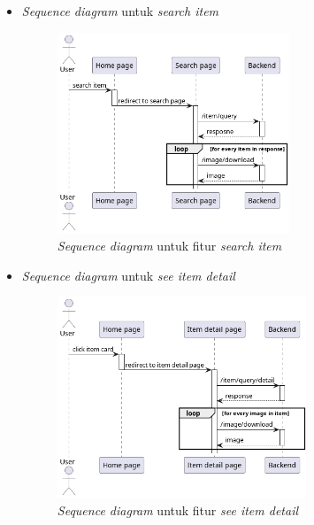 \documentclass[a4paper]{article}
\begin{document}
\begin{enumerate}
\begin{enumerate}
\begin{itemize}
            \newpage
            \item \textit{Sequence diagram} untuk \textit{search item}
            \begin{figure}[h]
                \centering
                \includegraphics*[height=6cm]{diagram/sequence diagram/FE/9. search item/search item.png}
                \caption{\textit{Sequence diagram} untuk fitur \textit{search item}}
            \end{figure}

            \item \textit{Sequence diagram} untuk \textit{see item detail}
            \begin{figure}[h]
                \centering
                \includegraphics*[height=6cm]{diagram/sequence diagram/FE/10. see item detail/see item detail.png}
                \caption{\textit{Sequence diagram} untuk fitur \textit{see item detail}}
            \end{figure}


\end{itemize}
\end{enumerate}
\end{enumerate}
\end{document}
